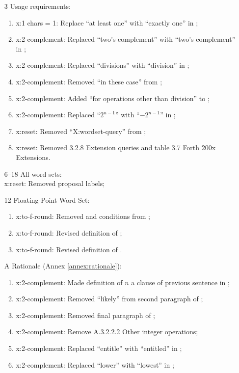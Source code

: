 \begin{itemize}
	\item[3] Usage requirements:					%
		\begin{enumerate}
		\item \textsf{x:1 chars = 1}: Replace ``at least one'' with ``exactly one'' in ;
		\item \textsf{x:2-complement}: Replaced ``two's complement'' with ``two's-complement'' in ;
		\item \textsf{x:2-complement}: Replaced ``divisions'' with ``division'' in ;
		\item \textsf{x:2-complement}: Removed ``in these case'' from ;
		\item \textsf{x:2-complement}: Added ``for operations other than division'' to ;
		\item \textsf{x:2-complement}: Replaced ``$2^{n-1}$'' with ``$-2^{n-1}$'' in ;
		\item \textsf{x:reset}: Removed ``X:wordset-query'' from ;
		\item \textsf{x:reset}: Removed 3.2.8 Extension queries and table 3.7 Forth 200x Extensions.
		\end{enumerate}
		
	\item[6--18] All word sets: ~\\
		\textsf{x:reset}: Removed proposal labels;

	\item[12] Floating-Point Word Set:			%
		\begin{enumerate}
		\item \textsf{x:to-f-round}: Removed  and  conditions from ;
		\item \textsf{x:to-f-round}: Revised definition of ;
		\item \textsf{x:to-f-round}: Revised definition of .
		\end{enumerate}

	\item[A] Rationale (Annex \ref{annex:rationale}): 	%
		\begin{enumerate}
		\item \textsf{x:2-complement}: Made definition of $n$ a clause of previous sentence in ;
		\item \textsf{x:2-complement}: Removed ``likely'' from second paragraph of ;
		\item \textsf{x:2-complement}: Removed final paragraph of ;
		\item \textsf{x:2-complement}: Remove A.3.2.2.2 Other integer operations;
		\item \textsf{x:2-complement}: Replaced ``entitle'' with ``entitled'' in ;
		\item \textsf{x:2-complement}: Replaced ``lower'' with ``lowest'' in ;


\end{enumerate}
\end{itemize}
